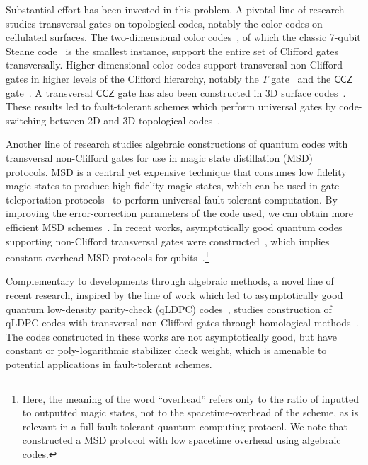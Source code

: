 \documentclass[11pt]{article}
\theoremstyle{definition}
\newcommand{\CCZ}{\mathsf{CCZ}}
\begin{document}
    
    Substantial effort has been invested in this problem.
    A pivotal line of research studies transversal gates on topological codes, notably the color codes on cellulated surfaces. 
    The two-dimensional color codes~\cite{Bombin2006topological}, of which the classic 7-qubit Steane code~\cite{calderbank1996good,steane1996multiple} is the smallest instance, support the entire set of Clifford gates transversally.
    Higher-dimensional color codes support transversal non-Clifford gates in higher levels of the Clifford hierarchy, notably the $T$ gate~\cite{bombin2015gauge,kubica2015universal} and the $\CCZ$ gate~\cite{Paetznick2013universal,Kubica2015unfolding}. A transversal $\CCZ$ gate has also been constructed in 3D surface codes~\cite{vasmer2019three}.
    These results led to fault-tolerant schemes which perform universal gates by code-switching between 2D and 3D topological codes~\cite{bombin2016dimensional,vasmer2019three}.
    
    Another line of research studies algebraic constructions of quantum codes with transversal non-Clifford gates for use in magic state distillation (MSD)~\cite{bravyi2005universal} protocols. 
    MSD is a central yet expensive technique that consumes low fidelity magic states to produce high fidelity magic states, which can be used in gate teleportation protocols~\cite{gottesman1999demonstrating} to perform universal fault-tolerant computation.
    By improving the error-correction parameters of the code used, we can obtain more efficient MSD schemes~\cite{bravyi2005universal,campbell2012magic,bravyi2012magic,krishna2019towards}. 
    In recent works, asymptotically good quantum codes supporting non-Clifford transversal gates were constructed~\cite{wills2024constant,golowich2024asymptoticallygoodquantumcodes,nguyen2024goodbinaryquantumcodes}, which implies constant-overhead MSD protocols for qubits~\cite{wills2024constant}.\footnote{Here, the meaning of the word ``overhead'' refers only to the ratio of inputted to outputted magic states, not to the spacetime-overhead of the scheme, as is relevant in a full fault-tolerant quantum computing protocol. We note that~\cite{nguyen2024quantum} constructed a MSD protocol with low spacetime overhead using algebraic codes.}
    
    Complementary to developments through algebraic methods, a novel line of recent research, inspired by the line of work which led to asymptotically good quantum low-density parity-check (qLDPC) codes~\cite{hastings2021fiber,panteleev2021quantum,breuckmann2021balanced,panteleev2022asymptotically,leverrier2022quantum,dinur2023good}, studies construction of qLDPC codes with transversal non-Clifford gates through homological methods~\cite{zhu2023non,scruby2024quantum,golowich2024quantum,lin2024transversal,hsin2024classifying,breuckmann2024cups,zhu2025topological}.
    The codes constructed in these works are not asymptotically good, but have constant or poly-logarithmic stabilizer check weight, 
    which is amenable to potential applications in fault-tolerant schemes.
\end{document}

